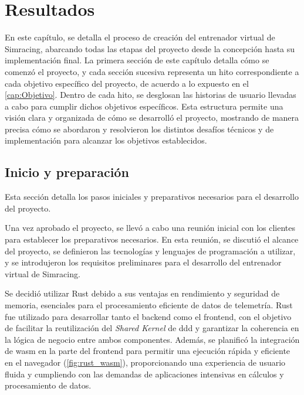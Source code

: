 \chapter{Resultados}
\label{cap:Resultados}

En este capítulo, se detalla el proceso de creación del entrenador virtual de Simracing, abarcando todas las etapas del proyecto desde la concepción hasta su implementación final. La primera sección de este capítulo detalla cómo se comenzó el proyecto, y cada sección sucesiva representa un hito correspondiente a cada objetivo específico del proyecto, de acuerdo a lo expuesto en el \autoref{cap:Objetivo}. Dentro de cada hito, se desglosan las historias de usuario llevadas a cabo para cumplir dichos objetivos específicos. Esta estructura permite una visión clara y organizada de cómo se desarrolló el proyecto, mostrando de manera precisa cómo se abordaron y resolvieron los distintos desafíos técnicos y de implementación para alcanzar los objetivos establecidos.

\section{Inicio y preparación}
Esta sección detalla los pasos iniciales y preparativos necesarios para el desarrollo del proyecto.

Una vez aprobado el proyecto, se llevó a cabo una reunión inicial con los clientes para establecer los preparativos necesarios. En esta reunión, se discutió el alcance del proyecto, se definieron las tecnologías y lenguajes de programación a utilizar, y se introdujeron los requisitos preliminares para el desarrollo del entrenador virtual de Simracing.

Se decidió utilizar Rust debido a sus ventajas en rendimiento y seguridad de memoria, esenciales para el procesamiento eficiente de datos de telemetría. Rust fue utilizado para desarrollar tanto el backend como el frontend, con el objetivo de facilitar la reutilización del \textit{Shared Kernel} de \ac{ddd} y garantizar la coherencia en la lógica de negocio entre ambos componentes. Además, se planificó la integración de \ac{wasm} en la parte del frontend para permitir una ejecución rápida y eficiente en el navegador (\autoref{fig:rust_wasm}), proporcionando una experiencia de usuario fluida y cumpliendo con las demandas de aplicaciones intensivas en cálculos y procesamiento de datos.

